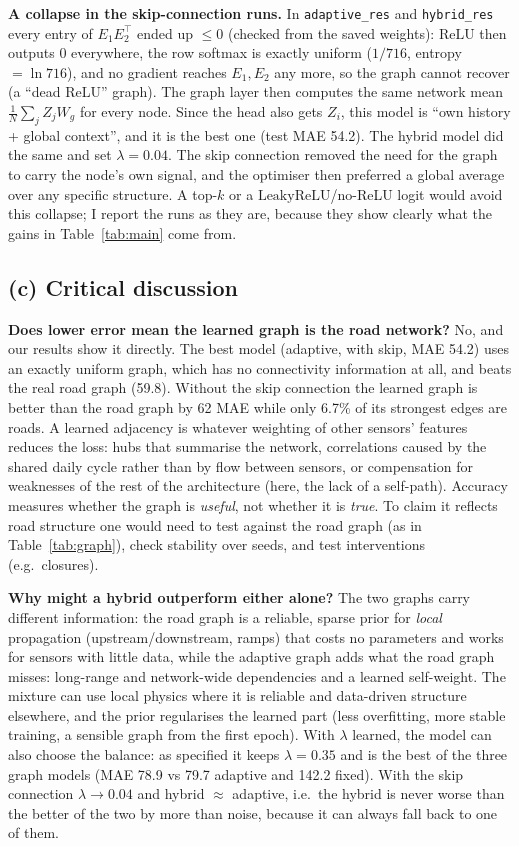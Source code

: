 \noindent\textbf{A collapse in the skip-connection runs.} In \texttt{adaptive\_res} and \texttt{hybrid\_res} every entry of $E_1E_2^\top$ ended up
$\le0$ (checked from the saved weights): $\mathrm{ReLU}$ then outputs 0 everywhere, the row softmax is exactly uniform ($1/716$, entropy
$=\ln716$), and no gradient reaches $E_1,E_2$ any more, so the graph cannot recover (a ``dead ReLU'' graph). The graph layer then computes
the same network mean $\frac1N\sum_jZ_jW_g$ for every node. Since the head also gets $Z_i$, this model is ``own history + global context'',
and it is the best one (test MAE 54.2). The hybrid model did the same and set $\lambda=0.04$. The skip connection removed the need
for the graph to carry the node's own signal, and the optimiser then preferred a global average over any specific structure. A top-$k$
or a $\mathrm{LeakyReLU}$/no-ReLU logit would avoid this collapse; I report the runs as they are, because they show clearly what the gains
in Table~\ref{tab:main} come from.

\subsection*{(c) Critical discussion}
\textbf{Does lower error mean the learned graph is the road network?} No, and our results show it directly. The best model
(adaptive, with skip, MAE 54.2) uses an exactly uniform graph, which has no connectivity information at all, and beats the real road graph
(59.8). Without the skip connection the learned graph is better than the road graph by 62 MAE while only 6.7\% of its strongest edges are
roads. A learned adjacency is whatever weighting of other sensors' features reduces the loss: hubs that summarise the network,
correlations caused by the shared daily cycle rather than by flow between sensors, or compensation for weaknesses of the rest of
the architecture (here, the lack of a self-path). Accuracy measures whether the graph is \emph{useful}, not whether it is \emph{true}. To
claim it reflects road structure one would need to test against the road graph (as in Table~\ref{tab:graph}), check stability over seeds,
and test interventions (e.g.\ closures).

\textbf{Why might a hybrid outperform either alone?} The two graphs carry different information: the road graph is a reliable,
sparse prior for \emph{local} propagation (upstream/downstream, ramps) that costs no parameters and works for sensors with little data,
while the adaptive graph adds what the road graph misses: long-range and network-wide dependencies and a learned self-weight. The mixture
can use local physics where it is reliable and data-driven structure elsewhere, and the prior regularises the learned part (less
overfitting, more stable training, a sensible graph from the first epoch). With $\lambda$ learned, the model can also choose the
balance: as specified it keeps $\lambda=0.35$ and is the best of the three graph models (MAE 78.9 vs 79.7 adaptive and 142.2
fixed). With the skip connection $\lambda\to0.04$ and hybrid $\approx$ adaptive, i.e.\ the hybrid is never worse than the better of the
two by more than noise, because it can always fall back to one of them.

